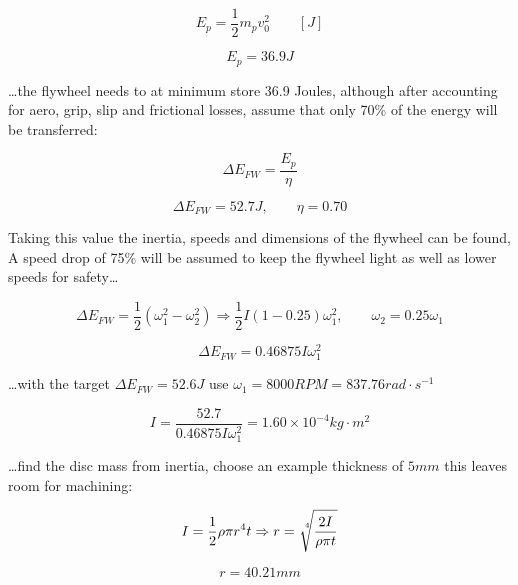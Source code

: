 \documentclass[a4paper,10pt]{article} %
\begin{document}
\begin{equation}
    E_p = \frac{1}{2}m_pv^2_0 \qquad [J]
\end{equation}

\begin{equation*}
    E_p = 36.9J
\end{equation*}

\ldots the flywheel needs to at minimum store 36.9 Joules, although after accounting for aero, grip, slip and frictional losses, assume that only 70\% of the energy will be transferred:

\begin{equation}
    \Delta E_{FW} = \frac{E_p}{\eta}
\end{equation}

\begin{equation*}
    \Delta E_{FW} = 52.7J, \qquad \eta = 0.70
\end{equation*}

\noindent Taking this value the inertia, speeds and dimensions of the flywheel can be found, A speed drop of 75\% will be assumed to keep the flywheel light as well as lower speeds for safety\ldots

\begin{equation}
    \Delta E_{FW} = \frac{1}{2}(\omega^2_1-\omega^2_2) \Rightarrow \frac{1}{2}I(1-0.25)\omega^2_1, \qquad     \omega_2 = 0.25\omega_1
\end{equation}

\begin{equation*}
    \Delta E_{FW} = 0.46875 I \omega^2_1
\end{equation*}

\ldots with the target $\Delta E_{FW} = 52.6J$ use $\omega_1 = 8000 RPM = 837.76 rad \cdot s^{-1}$

\begin{equation*}
    I = \frac{52.7}{0.46875 I \omega^2_1} = 1.60 \times 10^{-4} kg \cdot m^2
\end{equation*}

\ldots find the disc mass from inertia, choose an example thickness of $5mm$ this leaves room for machining:

\begin{equation}
    I = \frac{1}{2}\rho \pi r^4 t \Rightarrow r = \sqrt[\leftroot{-3}\uproot{3}4]{\frac{2 I}{\rho \pi t}}
\end{equation}

\begin{equation*}
    r = 40.21mm
\end{equation*}
\end{document}
